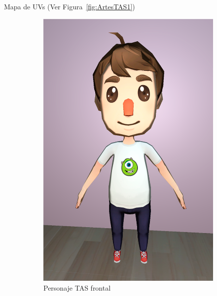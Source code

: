 \documentclass[12pt, a4paper,twoside,titlepage]{book}
\begin{document}
 Mapa de UVs (Ver Figura~\ref{fig:ArtesTAS1})
 
 \begin{figure}
\centering
\begin{subfigure}{.5\textwidth}
  \centering
  \includegraphics[width=.95\linewidth]{TGF/Artes/TAS_front.png}
  \caption{Personaje TAS frontal}
\end{subfigure}%
\begin{subfigure}{.5\textwidth}
  \centering

\end{subfigure}
\end{figure}
\end{document}
